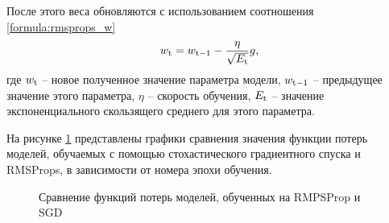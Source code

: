 После этого веса обновляются с использованием соотношения \ref{formula:rmsprops_w}
\begin{equation}\label{formula:rmsprops_w}
w_{\rm{t}} = w_{\rm{t-1}} - \frac{\eta}{\sqrt{E_{\rm{t}}}}g,
\end{equation}
где $w_{\rm{t}}$ -- новое полученное значение параметра модели, $w_{\rm{t-1}}$ -- предыдущее значение этого параметра, $\eta$ -- скорость обучения, $E_{\rm{t}}$ -- значение экспоненциального скользящего среднего для этого параметра.

На рисунке \ref{img:sgd_rmsprops_test} представлены графики сравнения значения функции потерь моделей, обучаемых с помощью стохастического градиентного спуска и RMSProps, в зависимости от номера эпохи обучения.

		
		
		
		
\begin{figure}[H]
	\begin{center}
		\caption{Сравнение функций потерь моделей, обученных на RMPSProp и SGD}
		\label{img:sgd_rmsprops_test}
	\end{center}
\end{figure}

